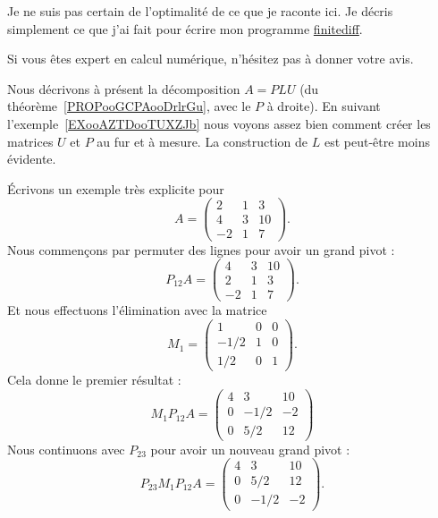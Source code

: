 \begin{probleme}
	Je ne suis pas certain de l'optimalité de ce que je raconte ici. Je décris simplement ce que j'ai fait pour écrire mon programme \href{https://github.com/LaurentClaessens/finitediff}{finitediff}.

	Si vous êtes expert en calcul numérique, n'hésitez pas à donner votre avis.
\end{probleme}

Nous décrivons à présent la décomposition \( A=PLU\) (du théorème~\ref{PROPooGCPAooDrlrGu}, avec le \( P \) à droite). En suivant l'exemple~\ref{EXooAZTDooTUXZJb} nous voyons assez bien comment créer les matrices \( U\) et \( P\) au fur et à mesure. La construction de \( L\) est peut-être moins évidente.

Écrivons un exemple très explicite pour
\begin{equation}
	A=\begin{pmatrix}
		2  & 1 & 3  \\
		4  & 3 & 10 \\
		-2 & 1 & 7
	\end{pmatrix}.
\end{equation}
Nous commençons par permuter des lignes pour avoir un grand pivot :
\begin{equation}
	P_{12}A=\begin{pmatrix}
		4  & 3 & 10 \\
		2  & 1 & 3  \\
		-2 & 1 & 7
	\end{pmatrix}.
\end{equation}
Et nous effectuons l'élimination avec la matrice
\begin{equation}
	M_1=\begin{pmatrix}
		1    & 0 & 0 \\
		-1/2 & 1 & 0 \\
		1/2  & 0 & 1
	\end{pmatrix}.
\end{equation}
Cela donne le premier résultat :
\begin{equation}        \label{EQooKTBLooHeOkgk}
	M_1P_{12}A=\begin{pmatrix}
		4 & 3    & 10 \\
		0 & -1/2 & -2 \\
		0 & 5/2  & 12
	\end{pmatrix}
\end{equation}
Nous continuons avec \( P_{23}\) pour avoir un nouveau grand pivot :
\begin{equation}
	P_{23}M_1P_{12}A=\begin{pmatrix}
		4 & 3    & 10 \\
		0 & 5/2  & 12 \\
		0 & -1/2 & -2
	\end{pmatrix}.
\end{equation}
